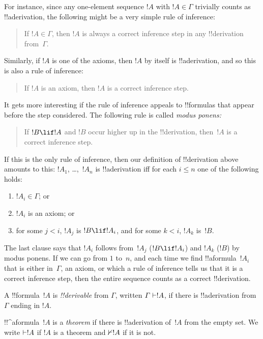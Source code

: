 \documentclass[../../../include/open-logic-section]{subfiles}
\begin{document}
For instance, since any one-element sequence $!A$ with $!A \in \Gamma$
trivially counts as !!a{derivation}, the following might be a very
simple rule of inference:
\begin{quote}
  If $!A \in \Gamma$, then $!A$ is always a correct inference step in
  any !!{derivation} from~$\Gamma$.
\end{quote}
Similarly, if $!A$ is one of the axioms, then $!A$ by itself is
!!a{derivation}, and so this is also a rule of inference:
\begin{quote}
  If $!A$ is an axiom, then $!A$ is a correct inference step.
\end{quote}
It gets more interesting if the rule of inference appeals to
!!{formula}s that appear before the step considered. The following
rule is called \emph{modus ponens:}
\begin{quote}
  If $!B \lif !A$ and $!B$ occur higher up in the !!{derivation},
  then~$!A$ is a correct inference step.
\end{quote}
If this is the only rule of inference, then our definition of
!!{derivation} above amounts to this: $!A_1$, \dots,~$!A_n$ is
!!a{derivation} iff for each $i \le n$ one of the following holds:
\begin{enumerate}
\item $!A_i \in \Gamma$; or
\item $!A_i$ is an axiom; or
\item for some $j < i$, $!A_j$ is $!B \lif !A_i$, and for some $k < i$,
  $!A_k$ is~$!B$.
\end{enumerate}
The last clause says that $!A_i$ follows from~$!A_j$ ($!B \lif !A_i$) and $!A_k$
($!B$) by modus ponens. If we can go from $1$ to~$n$, and
each time we find !!a{formula}~$!A_i$ that is either in~$\Gamma$, an
axiom, or which a rule of inference tells us that it is a correct
inference step, then the entire sequence counts as a correct
!!{derivation}.

\begin{defn}[!!^{derivability}]
A !!{formula}~$!A$ is \emph{!!{derivable}} from $\Gamma$, written
$\Gamma \Proves !A$, if there is !!a{derivation} from $\Gamma$ ending
in $!A$.
\end{defn}

\begin{defn}[Theorems]
!!^a{formula}~$!A$ is a \emph{theorem} if there is !!a{derivation}
of~$!A$ from the empty set.  We write $\Proves !A$ if $!A$ is a
theorem and $\Proves/ !A$ if it is not.
\end{defn}
\end{document}
